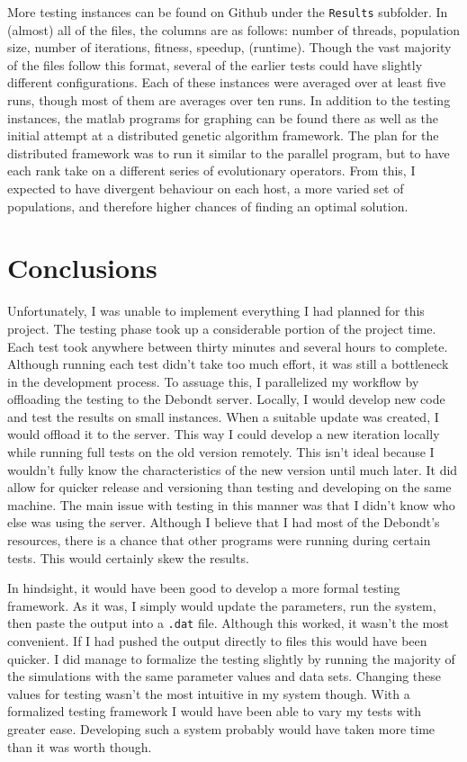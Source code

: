 \documentclass[10pt,letterpaper]{article}
\begin{document}
More testing instances can be found on Github under the \texttt{Results} subfolder. In (almost) all of the files, the columns are as follows: number of threads, population size, number of iterations, fitness, speedup, (runtime). Though the vast majority of the files follow this format, several of the earlier tests could have slightly different configurations. Each of these instances were averaged over at least five runs, though most of them are averages over ten runs. In addition to the testing instances, the matlab programs for graphing can be found there as well as the initial attempt at a distributed genetic algorithm framework. The plan for the distributed framework was to run it similar to the parallel program, but to have each rank take on a different series of evolutionary operators. From this, I expected to have divergent behaviour on each host, a more varied set of populations, and therefore higher chances of finding an optimal solution.

\newpage
\section{Conclusions}
Unfortunately, I was unable to implement everything I had planned for this project. The testing phase took up a considerable portion of the project time. Each test took anywhere between thirty minutes and several hours to complete. Although running each test didn't take too much effort, it was still a bottleneck in the development process. To assuage this, I parallelized my workflow by offloading the testing to the Debondt server. Locally, I would develop new code and test the results on small instances. When a suitable update was created, I would offload it to the server. This way I could develop a new iteration locally while running full tests on the old version remotely. This isn't ideal because I wouldn't fully know the characteristics of the new version until much later. It did allow for quicker release and versioning than testing and developing on the same machine. The main issue with testing in this manner was that I didn't know who else was using the server. Although I believe that I had most of the Debondt's resources, there is a chance that other programs were running during certain tests. This would certainly skew the results.

In hindsight, it would have been good to develop a more formal testing framework. As it was, I simply would update the parameters, run the system, then paste the output into a \texttt{.dat} file. Although this worked, it wasn't the most convenient. If I had pushed the output directly to files this would have been quicker. I did manage to formalize the testing slightly by running the majority of the simulations with the same parameter values and data sets. Changing these values for testing wasn't the most intuitive in my system though. With a formalized testing framework I would have been able to vary my tests with greater ease. Developing such a system probably would have taken more time than it was worth though.
\end{document}
